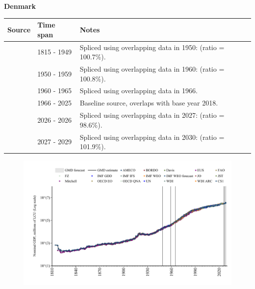 \documentclass[12pt,a4paper,landscape]{article}
\begin{document}
\begin{adjustbox}{max totalsize={\paperwidth}{\paperheight},center}
\begin{minipage}[t][\textheight][t]{\textwidth}
\vspace*{0.5cm}
{}
\begin{center}
{\Large\bfseries Denmark}
\end{center}
\vspace{0.5cm}
\begin{table}[H]
\centering
\small
\begin{tabular}{|l|l|l|}
\hline
\textbf{Source} & \textbf{Time span} & \textbf{Notes} \\
\hline
\rowcolor{white}\cite{CS1_DNK}& 1815 - 1949 &Spliced using overlapping data in 1950: (ratio = 100.7\%).\\
\rowcolor{lightgray}\cite{IMF_GDD}& 1950 - 1959 &Spliced using overlapping data in 1960: (ratio = 100.8\%).\\
\rowcolor{white}\cite{AMECO}& 1960 - 1965 &Spliced using overlapping data in 1966.\\
\rowcolor{lightgray}\cite{OECD_EO}& 1966 - 2025 &Baseline source, overlaps with base year 2018.\\
\rowcolor{white}\cite{AMECO}& 2026 - 2026 &Spliced using overlapping data in 2027: (ratio = 98.6\%).\\
\rowcolor{lightgray}\cite{IMF_WEO_forecast}& 2027 - 2029 &Spliced using overlapping data in 2030: (ratio = 101.9\%).\\
\hline
\end{tabular}
\end{table}
\begin{figure}[H]
\centering
\includegraphics[width=\textwidth,height=0.6\textheight,keepaspectratio]{graphs/DNK_nGDP.pdf}
\end{figure}
\end{minipage}
\end{adjustbox}
\end{document}
